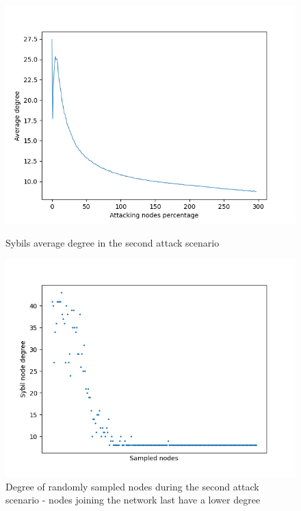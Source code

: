     \begin{figure}[ht]
        \begin{minipage}[b]{0.5\linewidth}
            \centering
            \includegraphics[width=1.1\textwidth]{pict/results/ex-atk-avg-degree.png}
			\caption{Sybils average degree in the second attack scenario}
			\label{fig:ex-atk-degree}
        \end{minipage}
        \hspace{0.5cm}
        \begin{minipage}[b]{0.5\linewidth}
			\centering
			\includegraphics[width=1.1\textwidth]{pict/results/ex-atk-dd.png}
			\caption{Degree of randomly sampled nodes during the second attack scenario - nodes joining the network last have a lower degree}
			\label{fig:dd}
        \end{minipage}
    \end{figure}


